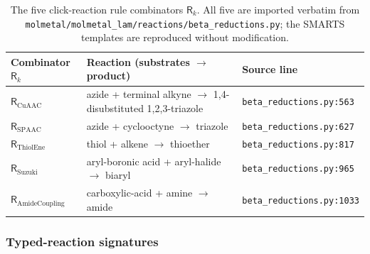 \begin{table}[h]
  \centering
  \caption{The five click-reaction rule combinators
  $\mathsf{R}_{k}$. All five are imported verbatim from
  \texttt{molmetal/molmetal\_lam/reactions/beta\_reductions.py};
  the SMARTS templates are reproduced without modification.}
  \label{tab:click-rules}
  \begin{tabular}{lll}
    \hline
    Combinator $\mathsf{R}_{k}$ & Reaction (substrates $\to$ product) & Source line \\
    \hline
    $\mathsf{R}_{\text{CuAAC}}$         & azide + terminal alkyne $\to$ 1,4-disubstituted 1,2,3-triazole          & \texttt{beta\_reductions.py:563} \\
    $\mathsf{R}_{\text{SPAAC}}$         & azide + cyclooctyne $\to$ triazole                                       & \texttt{beta\_reductions.py:627} \\
    $\mathsf{R}_{\text{ThiolEne}}$      & thiol + alkene $\to$ thioether                                           & \texttt{beta\_reductions.py:817} \\
    $\mathsf{R}_{\text{Suzuki}}$        & aryl-boronic acid + aryl-halide $\to$ biaryl                             & \texttt{beta\_reductions.py:965} \\
    $\mathsf{R}_{\text{AmideCoupling}}$ & carboxylic-acid + amine $\to$ amide                                      & \texttt{beta\_reductions.py:1033} \\
    \hline
  \end{tabular}
\end{table}

\subsubsection{Typed-reaction signatures}
\label{sec:click-chem-types}

